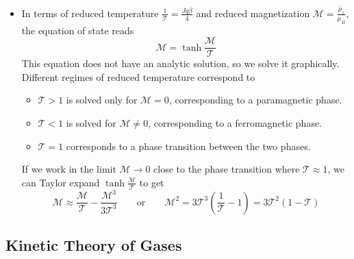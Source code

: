 \documentclass[11pt, a4paper]{article}
\newcommand{\eqtext}[1]{\qquad \text{#1} \qquad}
\begin{document}
\begin{itemize}
	\item In terms of reduced temperature $ \frac{1}{\mathcal{T}} = \frac{Jq\beta}{4} $ and reduced magnetization $ \mathcal{M} = \frac{\bar{\mu}_{z}}{\mu_{B}} $, the equation of state reads
	\begin{equation*}
		\mathcal{M} = \tanh \frac{\mathcal{M}}{\mathcal{T}}
	\end{equation*}
	This equation does not have an analytic solution, so we solve it graphically. Different regimes of reduced temperature correspond to
	\begin{itemize}
		\item $ \mathcal{T} > 1$ is solved only for $ \mathcal{M} = 0 $, corresponding to a paramagnetic phase. 
		\item $ \mathcal{T} < 1$ is solved for $ \mathcal{M} \neq 0 $, corresponding to a ferromagnetic phase. 
		\item $ \mathcal{T} = 1$ corresponds to a phase transition between the two phases.
	\end{itemize}
	If we work in the limit $ \mathcal{M} \to 0 $ close to the phase transition where $ \mathcal{T} \approx 1 $, we can Taylor expand $ \tanh \frac{\mathcal{M}}{\mathcal{T}} $ to get
	\begin{equation*}
		\mathcal{M} \approx \frac{\mathcal{M}}{\mathcal{T}} - \frac{\mathcal{M}^{3}}{3\mathcal{T}^{3}} \eqtext{or} \mathcal{M}^{2} = 3 \mathcal{T}^{3}\left(\frac{1}{\mathcal{T}}-1\right) = 3\mathcal{T}^{2}(1 - \mathcal{T})
	\end{equation*}

\end{itemize}
\fi


\subsection{Kinetic Theory of Gases}
\end{document}
